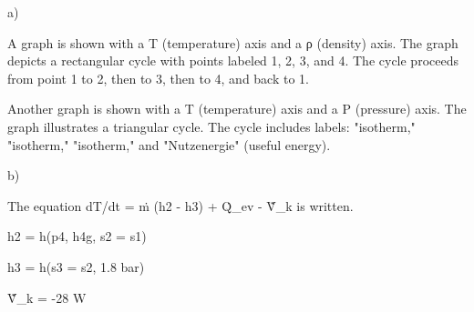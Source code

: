 a) 

A graph is shown with a T (temperature) axis and a ρ (density) axis. The graph depicts a rectangular cycle with points labeled 1, 2, 3, and 4. The cycle proceeds from point 1 to 2, then to 3, then to 4, and back to 1.

Another graph is shown with a T (temperature) axis and a P (pressure) axis. The graph illustrates a triangular cycle. The cycle includes labels: "isotherm," "isotherm," "isotherm," and "Nutzenergie" (useful energy).

b) 

The equation dT/dt = ṁ (h2 - h3) + Q̇_ev - Ṽ̇_k is written. 

h2 = h(p4, h4g, s2 = s1)

h3 = h(s3 = s2, 1.8 bar)

Ṽ̇_k = -28 W